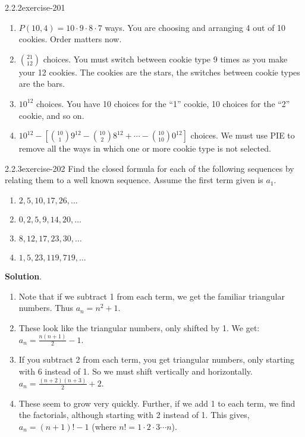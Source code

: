 \documentclass[twoside,11pt,]{book}
\numberwithin{equation}{chapter}
\begin{document}
\begin{divisionsolution}{2.2.2}{}{exercise-201}
\begin{enumerate}[label=(\alph*)]
\item\hypertarget{li-1850}{}\hypertarget{p-3164}{}%
\(P(10, 4) = 10 \cdot 9 \cdot 8 \cdot 7\) ways. You are choosing and arranging 4 out of 10 cookies. Order matters now.%
\item\hypertarget{li-1851}{}\hypertarget{p-3165}{}%
\({21 \choose 12}\) choices. You must switch between cookie type 9 times as you make your 12 cookies. The cookies are the stars, the switches between cookie types are the bars.%
\item\hypertarget{li-1852}{}\hypertarget{p-3166}{}%
\(10^{12}\) choices. You have 10 choices for the ``1'' cookie, 10 choices for the ``2'' cookie, and so on.%
\item\hypertarget{li-1853}{}\hypertarget{p-3167}{}%
\(10^{12} - \left[{10 \choose 1}9^{12} - {10 \choose 2}8^{12} + \cdots - {10 \choose 10}0^{12} \right]\) choices. We must use PIE to remove all the ways in which one or more cookie type is not selected.%
\end{enumerate}
%
\end{divisionsolution}%
\begin{divisionsolution}{2.2.3}{}{exercise-202}%
\hypertarget{p-3174}{}%
Find the closed formula for each of the following sequences by relating them to a well known sequence. Assume the first term given is \(a_1\text{.}\)\leavevmode%
\begin{enumerate}[label=(\alph*)]
\item\hypertarget{li-1862}{}\hypertarget{p-3175}{}%
\(2, 5, 10, 17, 26, \ldots\)%
\item\hypertarget{li-1863}{}\hypertarget{p-3176}{}%
\(0, 2, 5, 9, 14, 20, \ldots\)%
\item\hypertarget{li-1864}{}\hypertarget{p-3177}{}%
\(8, 12, 17, 23, 30,\ldots\)%
\item\hypertarget{li-1865}{}\hypertarget{p-3178}{}%
\(1, 5, 23, 119, 719,\ldots\)%
\end{enumerate}
%
\par\smallskip%
\noindent\textbf{Solution}.\quad%
\hypertarget{p-3179}{}%
\leavevmode%
\begin{enumerate}[label=(\alph*)]
\item\hypertarget{li-1866}{}\hypertarget{p-3180}{}%
Note that if we subtract 1 from each term, we get the familiar triangular numbers. Thus \(a_n = n^2 + 1\text{.}\)%
\item\hypertarget{li-1867}{}\hypertarget{p-3181}{}%
These look like the triangular numbers, only shifted by 1. We get: \(a_n = \frac{n(n+1)}{2} - 1\text{.}\)%
\item\hypertarget{li-1868}{}\hypertarget{p-3182}{}%
If you subtract 2 from each term, you get triangular numbers, only starting with 6 instead of 1. So we must shift vertically and horizontally. \(a_n = \frac{(n+2)(n+3)}{2} + 2\text{.}\)%
\item\hypertarget{li-1869}{}\hypertarget{p-3183}{}%
These seem to grow very quickly. Further, if we add 1 to each term, we find the factorials, although starting with 2 instead of 1. This gives, \(a_n = (n+1)! - 1\) (where \(n! = 1 \cdot 2 \cdot 3 \cdots n\)).%
\end{enumerate}
%
\end{divisionsolution}%
\end{document}

